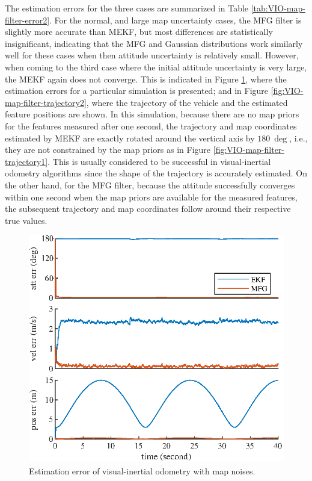 The estimation errors for the three cases are summarized in Table \ref{tab:VIO-map-filter-error2}.
For the normal, and large map uncertainty cases, the MFG filter is slightly more accurate than MEKF, but most differences are statistically insignificant, indicating that the MFG and Gaussian distributions work similarly well for these cases when then attitude uncertainty is relatively small.
However, when coming to the third case where the initial attitude uncertainty is very large, the MEKF again does not converge.
This is indicated in Figure \ref{fig:VIO-map-filter-error2}, where the estimation errors for a particular simulation is presented; and in Figure \ref{fig:VIO-map-filter-trajectory2}, where the trajectory of the vehicle and the estimated feature positions are shown.
In this simulation, because there are no map priors for the features measured after one second, the trajectory and map coordinates estimated by MEKF are exactly rotated around the vertical axis by $\SI{180}{\deg}$, i.e., they are not constrained by the map priors as in Figure \ref{fig:VIO-map-filter-trajectory1}.
This is usually considered to be successful in visual-inertial odometry algorithms since the shape of the trajectory is accurately estimated.
On the other hand, for the MFG filter, because the attitude successfully converges within one second when the map priors are available for the measured features, the subsequent trajectory and map coordinates follow around their respective true values.

\begin{figure}
	\centering
	\includegraphics[scale=1.3]{figures/VIO-map-filter-error2}
	\caption{Estimation error of visual-inertial odometry with map noises.}
	\label{fig:VIO-map-filter-error2}
\end{figure}

